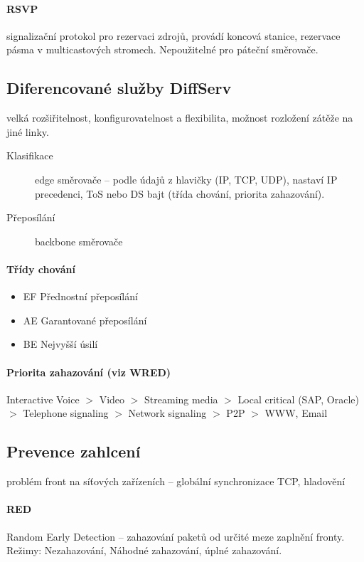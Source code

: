 \documentclass[a4paper, 11pt]{report}
\begin{document}
\paragraph{RSVP} signalizační protokol pro rezervaci zdrojů, provádí koncová stanice, rezervace pásma v multicastových stromech. Nepoužitelné pro páteční směrovače.

\subsection{Diferencované služby DiffServ}
velká rozšiřitelnost, konfigurovatelnost a flexibilita, možnost rozložení zátěže na jiné linky.
\begin{description}
	\item[Klasifikace] edge směrovače -- podle údajů z hlavičky (IP, TCP, UDP), nastaví IP precedenci, ToS nebo DS bajt (třída chování, priorita zahazování).
	\item[Přeposílání] backbone směrovače
\end{description}

\paragraph{Třídy chování}
\begin{itemize}
	\item EF Přednostní přeposílání
	\item AE Garantované přeposílání
	\item BE Nejvyšší úsilí
\end{itemize}

\paragraph{Priorita zahazování (viz WRED)}

Interactive Voice $>$ Video $>$ Streaming media $>$ Local critical (SAP, Oracle) $>$ Telephone signaling $>$ Network signaling $>$ P2P $>$ WWW, Email

\subsection{Prevence zahlcení}
problém front na síťových zařízeních -- globální synchronizace TCP, hladovění

\paragraph{RED} Random Early Detection -- zahazování paketů od určité meze zaplnění fronty. Režimy: Nezahazování, Náhodné zahazování, úplné zahazování.
\end{document}
